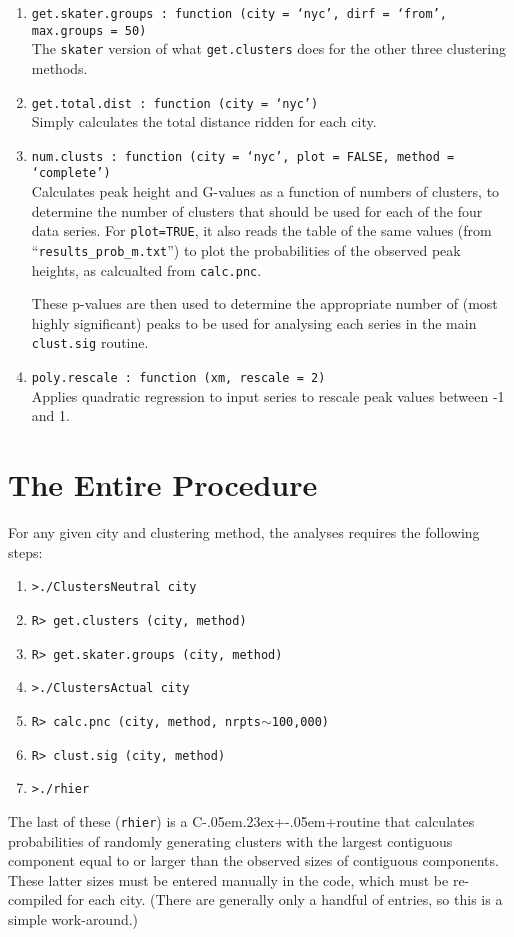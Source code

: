 \documentclass[a4paper,oneside]{article}
\def\CPP{{C\kern-.05em\raise.23ex\hbox{+\kern-.05em+}\hspace{4pt}}}
\begin{document}
\begin{enumerate}
    \item {\tt get.skater.groups : function (city = `nyc', dirf = `from', max.groups = 50)}\\
        The {\tt skater} version of what {\tt get.clusters} does for the other three clustering methods.
    \item {\tt get.total.dist : function (city = `nyc')}\\
        Simply calculates the total distance ridden for each city.
    \item {\tt num.clusts : function (city = `nyc', plot = FALSE, method = `complete')}\\
        Calculates peak height and G-values as a function of numbers of clusters, to determine the number of clusters that should be used for
        each of the four data series. For {\tt plot=TRUE}, it also reads the table of the same values (from ``{\tt results\_prob\_m.txt}'') to plot
        the probabilities of the observed peak heights, as calcualted from {\tt calc.pnc}. 
        
        These p-values are then used to determine the appropriate number of (most highly significant) peaks to be used for analysing each series
        in the main {\tt clust.sig} routine.
    \item {\tt poly.rescale : function (xm, rescale = 2)}\\
        Applies quadratic regression to input series to rescale peak values between -1 and 1.
\end{enumerate}
\pagebreak


\section{The Entire Procedure}

For any given city and clustering method, the analyses requires the following steps:
\begin{enumerate}
    \item {\tt >./ClustersNeutral city}
    \item {\tt R> get.clusters (city, method)}
    \item {\tt R> get.skater.groups (city, method)}
    \item {\tt >./ClustersActual city}
    \item {\tt R> calc.pnc (city, method, nrpts$\sim$100,000)}
    \item {\tt R> clust.sig (city, method)}
    \item {\tt >./rhier}
\end{enumerate}
The last of these ({\tt rhier}) is a \CPP routine that calculates probabilities of randomly generating clusters with the largest contiguous
component equal to or larger than the observed sizes of contiguous components. These latter sizes must be entered manually in the code, which
must be re-compiled for each city. (There are generally only a handful of entries, so this is a simple work-around.)
\end{document}
